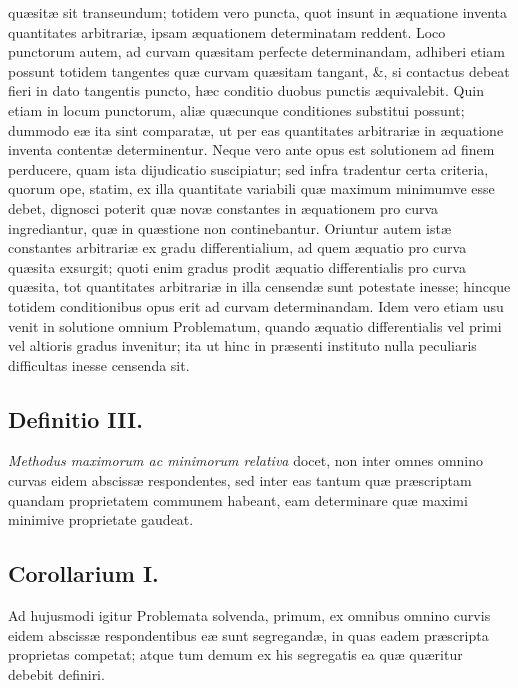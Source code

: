quæsitæ sit transeundum; totidem vero puncta, quot insunt in
æquatione inventa quantitates arbitrariæ, ipsam æquationem determinatam
reddent. Loco punctorum autem, ad curvam quæsitam perfecte determinandam,
adhiberi etiam possunt totidem tangentes quæ curvam quæsitam tangant, \&,
si contactus debeat fieri in dato tangentis puncto, hæc conditio duobus
punctis æquivalebit. Quin etiam in locum punctorum, aliæ quæcunque
conditiones substitui possunt; dummodo eæ ita sint comparatæ, ut per eas
quantitates arbitrariæ in æquatione inventa contentæ determinentur.
Neque vero ante opus est solutionem ad finem perducere, quam ista
dijudicatio suscipiatur; sed infra tradentur certa criteria, quorum ope,
statim, ex illa quantitate variabili quæ maximum minimumve esse debet,
dignosci poterit quæ novæ constantes in æquationem pro curva ingrediantur,
quæ in quæstione non continebantur. Oriuntur autem istæ constantes
arbitrariæ ex gradu differentialium, ad quem æquatio pro curva quæsita
exsurgit; quoti enim gradus prodit æquatio differentialis pro curva quæsita,
tot quantitates arbitrariæ in illa censendæ sunt potestate inesse;
hincque totidem conditionibus opus erit ad curvam determinandam. Idem
vero etiam usu venit in solutione omnium Problematum, quando æquatio
differentialis vel primi vel altioris gradus invenitur; ita ut hinc in
præsenti instituto nulla peculiaris difficultas inesse censenda sit.

\subsection*{Definitio III.}
\textit{Methodus maximorum ac minimorum relativa} docet, non
inter omnes omnino curvas eidem abscissæ respondentes, sed inter eas tantum
quæ præscriptam quandam proprietatem communem habeant, eam determinare quæ
maximi minimive proprietate gaudeat.

\subsection*{Corollarium I.}
Ad hujusmodi igitur Problemata solvenda, primum, ex
omnibus omnino curvis eidem abscissæ respondentibus eæ sunt
segregandæ, in
quas eadem præscripta proprietas competat; atque tum demum ex his segregatis
ea quæ quæritur debebit definiri.

